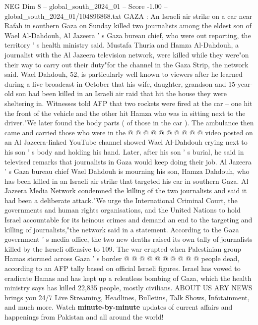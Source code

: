 \begin{textsample}{NEG Dim 8 – global\_south\_2024\_01 – Score -1.00 – global\_south\_2024\_01/104896868.txt}  \label{ex:f8_neg_052}
GAZA : An Israeli air strike on a car near Rafah in southern Gaza on Sunday killed two journalists among the eldest son of Wael Al-Dahdouh, Al Jazeera ' s Gaza bureau chief, who were out reporting, the territory ' s health ministry said.
Mustafa Thuria and Hamza Al-Dahdouh, a journalist with the Al Jazeera television network, were killed while they were"on their way to carry out their duty"for the channel in the Gaza Strip, the network said.
Wael Dahdouh, 52, is particularly well known to viewers after he learned during a live broadcast in October that his wife, daughter, grandson and 15-year-old son had been killed in an Israeli air raid that hit the house they were sheltering in.
Witnesses told AFP that two rockets were fired at the car -- one hit the front of the vehicle and the other hit Hamza who was in sitting next to the driver."We later found the body parts ( of those in the car ).
The ambulance then came and carried those who were in the @ @ @ @ @ @ @ @ @ @ video posted on an Al Jazeera-linked YouTube channel showed Wael Al-Dahdouh crying next to his son ' s body and holding his hand.
Later, after his son ' s burial, he said in televised remarks that journalists in Gaza would keep doing their job.
Al Jazeera ' s Gaza bureau chief Wael Dahdouh is mourning his son, Hamza Dahdouh, who has been killed in an Israeli air strike that targeted his car in southern Gaza.
Al Jazeera Media Network condemned the killing of the two journalists and said it had been a deliberate attack."We urge the International Criminal Court, the governments and human rights organisations, and the United Nations to hold Israel accountable for its heinous crimes and demand an end to the targeting and killing of journalists,"the network said in a statement.
According to the Gaza government ' s media office, the two new deaths raised its own tally of journalists killed by the Israeli offensive to 109.
The war erupted when Palestinian group Hamas stormed across Gaza ' s border @ @ @ @ @ @ @ @ @ @ people dead, according to an AFP tally based on official Israeli figures.
Israel has vowed to eradicate Hamas and has kept up a relentless bombing of Gaza, which the health ministry says has killed 22,835 people, mostly civilians.
ABOUT US ARY NEWS brings you 24/7 Live Streaming, Headlines, Bulletins, Talk Shows, Infotainment, and much more.
Watch \textbf{minute-by-minute} updates of current affairs and happenings from Pakistan and all around the world!

\end{textsample}
